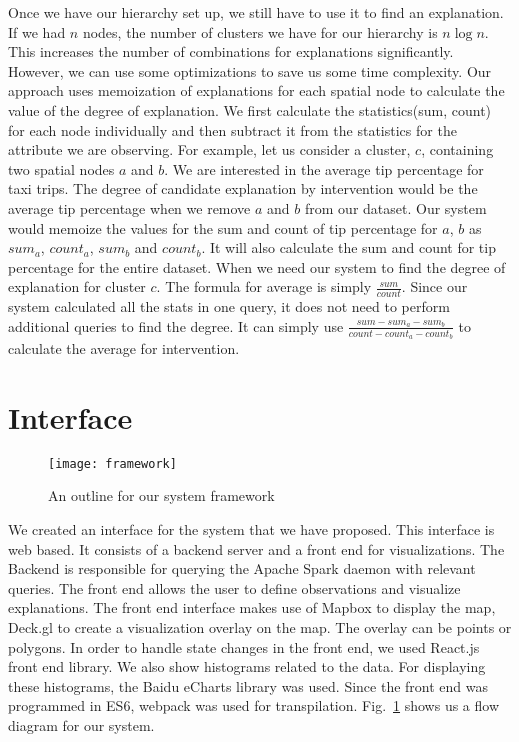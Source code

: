 Once we have our hierarchy set up, we still have to use it to find an explanation. If we had $n$ nodes, the number of clusters we have for our hierarchy is $n \log n$.  This increases the number of combinations for explanations significantly. However, we can use some optimizations to save us some time complexity. Our approach uses memoization of explanations for each spatial node to calculate the value of the degree of explanation. We first calculate the statistics(sum, count) for each node individually and then subtract it from the statistics for the attribute we are observing. For example, let us consider a cluster, $c$, containing two spatial nodes $a$ and $b$. We are interested in the average tip percentage for taxi trips. The degree of candidate explanation by intervention would be the average tip percentage when we remove $a$ and $b$ from our dataset. Our system would memoize the values for the sum and count of tip percentage for $a$, $b$ as $sum_a$, $count_a$, $sum_b$ and $count_b$. It will also calculate the sum and count for tip percentage for the entire dataset. When we need our system to find the degree of explanation for cluster $c$. The formula for average is simply $\frac{sum}{count}$. Since our system calculated all the stats in one query, it does not need to perform additional queries to find the degree. It can simply use $\frac{sum-sum_a-sum_b}{count-count_a-count_b}$ to calculate the average for intervention.


\section{Interface}

\begin{figure}[h]
\texttt{[image: framework]}
\caption{An outline for our system framework}
\label{fig:framework}
\end{figure}

We created an interface for the system that we have proposed. This interface is web based. It consists of a backend server and a front end for visualizations. The Backend is responsible for querying the Apache Spark daemon with relevant queries. The front end allows the user to define observations and visualize explanations. The front end interface makes use of Mapbox to display the map, Deck.gl to create a visualization overlay on the map. The overlay can be points or polygons. In order to handle state changes in the front end, we used React.js front end library. We also show histograms related to the data. For displaying these histograms, the Baidu eCharts library was used. Since the front end was programmed in ES6, webpack was used for transpilation\citep{webpack}. Fig.~\ref{fig:framework} shows us a flow diagram for our system.

